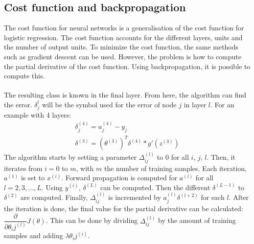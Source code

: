 \subsection{Cost function and backpropagation}
The cost function for neural networks is a generalisation of the cost function for logistic regression. The cost function accounts for the different layers, units and the number of output units. To minimize the cost function, the same methods such as gradient descent can be used. However, the problem is how to compute the partial derivative of the cost function. Using backpropagation, it is possible to compute this. \cite{neuralnetCost} \\\\
The resulting class is known in the final layer. From here, the algorithm can find the error. $\delta_j^l$ will be the symbol used for the error of node $j$ in layer $l$. For an example with 4 layers:
\begin{align}
\delta_j^{(4)} = a_j^{(4)} - y_j\\
\delta^{(3)} = (\theta^{(3)})^T\delta^{(4)} * g'(z^{(3)})
\end{align}
The algorithm starts by setting a parameter $\Delta_{ij}^{(l)}$ to 0 for all $i$, $j$, $l$. Then, it iterates from $i=0$ to $m$, with $m$ the number of training samples. Each iteration, $a^{(1)}$ is set to $x^{(i)}$. Forward propagation is computed for $a^{(l)}$ for all $l = 2,3,..., L$. Using $y^{(i)}$, $\delta^{(L)}$ can be computed. Then the different $\delta^{(L-1)}$ to $\delta^{(2)}$ are computed. Finally, $\Delta_{ij}^{(l)}$ is incremented by $a_j^{(l)}\delta^{(l+2)}$ for each $l$. After the iteration is done, the final value for the partial derivative can be calculated: $\dfrac{\partial}{\partial \theta_ij^{(l)}} J(\theta)$. This can be done by dividing $\Delta_{ij}^{(l)}$ by the amount of training samples and adding $\lambda\theta_ij^{(i)}$. \cite{neuralnetBackpropagation}
\begin{python}

\end{python}
